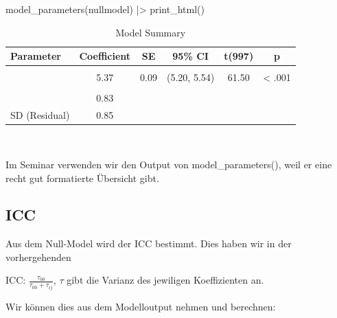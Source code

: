 \documentclass[
  letterpaper,
  DIV=11,
  numbers=noendperiod]{scrreprt}
\newenvironment{Shaded}{\begin{snugshade}}{\end{snugshade}}
\newcommand{\DecValTok}[1]{\textcolor[rgb]{0.68,0.00,0.00}{#1}}
\newcommand{\FunctionTok}[1]{\textcolor[rgb]{0.28,0.35,0.67}{#1}}
\newcommand{\NormalTok}[1]{\textcolor[rgb]{0.00,0.23,0.31}{#1}}
\newcommand{\OtherTok}[1]{\textcolor[rgb]{0.00,0.23,0.31}{#1}}
\newcommand{\SpecialCharTok}[1]{\textcolor[rgb]{0.37,0.37,0.37}{#1}}
\newcommand{\StringTok}[1]{\textcolor[rgb]{0.13,0.47,0.30}{#1}}
\begin{document}
\begin{Shaded}
\begin{Highlighting}[]
\FunctionTok{model\_parameters}\NormalTok{(nullmodel) }\SpecialCharTok{|\textgreater{}} \FunctionTok{print\_html}\NormalTok{()}
\end{Highlighting}
\end{Shaded}

\begin{table}
\caption*{
{\large Model Summary}
} 
\fontsize{12.0pt}{14.4pt}\selectfont
\begin{tabular*}{\linewidth}{@{\extracolsep{\fill}}lccccc}
\toprule
Parameter & Coefficient & SE & 95\% CI & t(997) & p \\ 
\midrule\addlinespace[2.5pt]
\multicolumn{6}{l}{{\slshape Fixed Effects }} \\[2.5pt] 
\midrule\addlinespace[2.5pt]
{(Intercept)} & 5.37 & 0.09 & (5.20, 5.54) & 61.50 & < .001 \\ 
\midrule\addlinespace[2.5pt]
\multicolumn{6}{l}{{\slshape Random Effects }} \\[2.5pt] 
\midrule\addlinespace[2.5pt]
{SD (Intercept: id)} & 0.83 &  &  &  &  \\ 
{SD (Residual)} & 0.85 &  &  &  &  \\ 
\bottomrule
\end{tabular*}
\begin{minipage}{\linewidth}
\\
\end{minipage}
\end{table}

Im Seminar verwenden wir den Output von model\_parameters(), weil er
eine recht gut formatierte Übersicht gibt.

\subsection{ICC}\label{icc}

Aus dem Null-Model wird der ICC bestimmt. Dies haben wir in der
vorhergehenden

ICC: \(\frac{\tau_{00}}{\tau_{00}+\tau_{ij}}\), \(\tau\) gibt die
Varianz des jewiligen Koeffizienten an.

Wir können dies aus dem Modelloutput nehmen und berechnen:

\begin{Shaded}
\end{Shaded}
\end{document}
